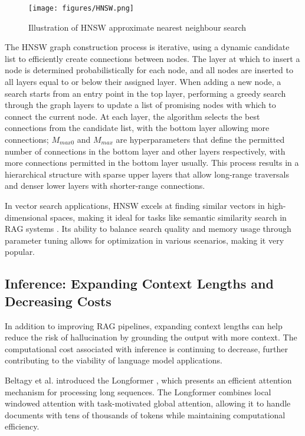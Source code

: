 \documentclass[a4paper, oneside]{discothesis}
\begin{document}
\begin{figure}[h]
    \centering
    \texttt{[image: figures/HNSW.png]}
    \caption{Illustration of HNSW approximate nearest neighbour search}
    \label{fig:hnsw_structure}
    \end{figure}

The HNSW graph construction process is iterative, using a dynamic candidate list to efficiently create connections between nodes. The layer at which to insert a node is determined probabilistically for each node, and all nodes are inserted to all layers equal to or below their assigned layer. When adding a new node, a search starts from an entry point in the top layer, performing a greedy search through the graph layers to update a list of promising nodes with which to connect the current node. At each layer, the algorithm selects the best connections from the candidate list, with the bottom layer allowing more connections; $M_{max0}$ and $M_{max}$ are hyperparameters that define the permitted number of connections in the bottom layer and other layers respectively, with more connections permitted in the bottom layer usually. This process results in a hierarchical structure with sparse upper layers that allow long-range traversals and denser lower layers with shorter-range connections.

In vector search applications, HNSW excels at finding similar vectors in high-dimensional spaces, making it ideal for tasks like semantic similarity search in RAG systems \cite{johnson2017billion}. Its ability to balance search quality and memory usage through parameter tuning allows for optimization in various scenarios, making it very popular. 

\subsection{Inference: Expanding Context Lengths and Decreasing Costs}
In addition to improving RAG pipelines, expanding context lengths can help reduce the risk of hallucination by grounding the output with more context. The computational cost associated with inference is continuing to decrease, further contributing to the viability of language model applications. 

Beltagy et al. introduced the Longformer \cite{beltagy2020longformer}, which presents an efficient attention mechanism for processing long sequences. The Longformer combines local windowed attention with task-motivated global attention, allowing it to handle documents with tens of thousands of tokens while maintaining computational efficiency.
\end{document}
